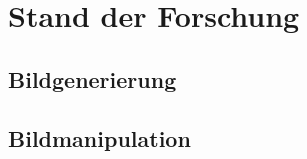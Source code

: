 \chapter{Stand der Forschung}\label{chp:forschungsstand} %
\glsresetall
\section{Bildgenerierung}
\section{Bildmanipulation}